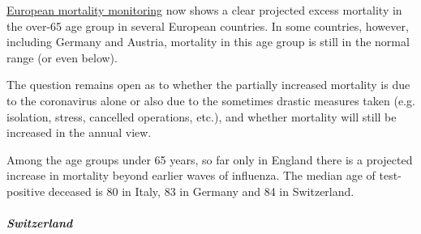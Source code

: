 \href{https://www.euromomo.eu/outputs/zscore_country_total.html}{European
mortality monitoring} now shows a clear projected excess mortality in
the over-65 age group in several European countries. In some countries,
however, including Germany and Austria, mortality in this age group is
still in the normal range (or even below).

The question remains open as to whether the partially increased
mortality is due to the coronavirus alone or also due to the sometimes
drastic measures taken (e.g. isolation, stress, cancelled operations,
etc.), and whether mortality will still be increased in the annual view.

Among the age groups under 65 years, so far only in England there is a
projected increase in mortality beyond earlier waves of influenza. The
median age of test-positive deceased is 80 in Italy, 83 in Germany and
84 in Switzerland.

\hypertarget{switzerland-1}{%
\subparagraph{\texorpdfstring{\textbf{Switzerland}}{Switzerland}}\label{switzerland-1}}

